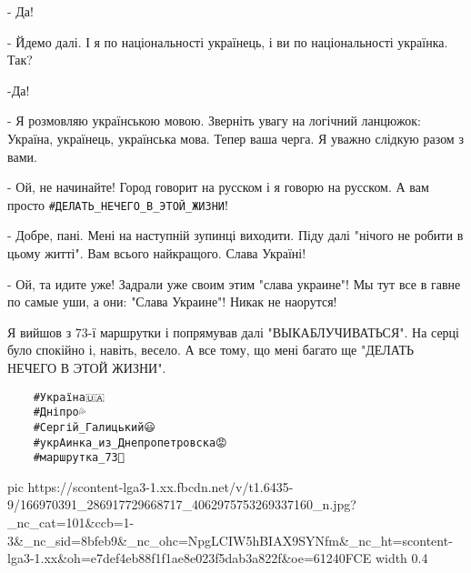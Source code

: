 - Да!

- Йдемо далі. І я по національності українець, і ви по національності українка.
Так?

-Да!

- Я розмовляю українською мовою. Зверніть увагу на логічний ланцюжок: Україна,
українець, українська мова. Тепер ваша черга. Я уважно слідкую разом з вами.

- Ой, не начинайте! Город говорит на русском і я говорю на русском. А вам
просто \verb|#ДЕЛАТЬ_НЕЧЕГО_В_ЭТОЙ_ЖИЗНИ|!

- Добре, пані. Мені на наступній зупинці виходити. Піду далі "нічого не робити
в цьому житті". Вам всього найкращого. Слава Україні!

- Ой, та идите уже! Задрали уже своим этим "слава украине"! Мы тут все в гавне
по самые уши, а они: "Слава Украине"! Никак не наорутся!

Я вийшов з 73-ї маршрутки і попрямував далі "ВЫКАБЛУЧИВАТЬСЯ". На серці було
спокійно і, навіть, весело. А все тому, що мені багато ще "ДЕЛАТЬ НЕЧЕГО В
ЭТОЙ ЖИЗНИ". 

\begin{verbatim}
	#Україна🇺🇦
	#Дніпро💦
	#Сергій_Галицький😃
	#укрАинка_из_Днепропетровска😡
	#маршрутка_73🚌
\end{verbatim}

\ifcmt
  pic https://scontent-lga3-1.xx.fbcdn.net/v/t1.6435-9/166970391_286917729668717_4062975753269337160_n.jpg?_nc_cat=101&ccb=1-3&_nc_sid=8bfeb9&_nc_ohc=NpgLCIW5hBIAX9SYNfm&_nc_ht=scontent-lga3-1.xx&oh=e7def4eb88f1f1ae8e023f5dab3a822f&oe=61240FCE
  width 0.4
\fi




